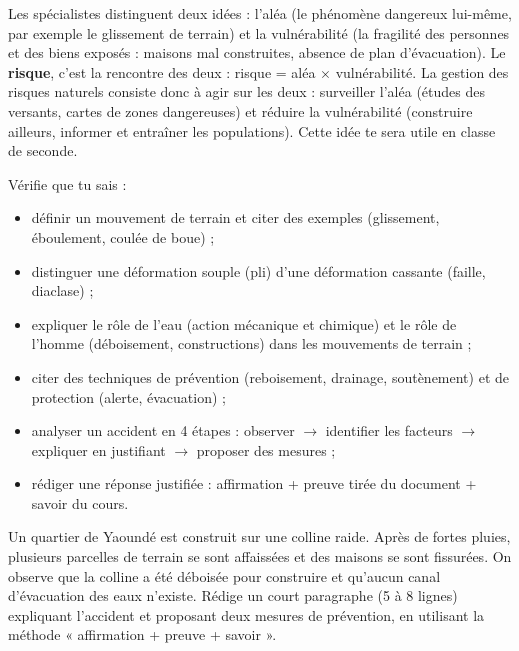\documentclass[11pt]{article}
\newcommand{\cle}[1]{{\popxbold\color{popdark}#1}}
\newcounter{popsec}
\newcounter{popsub}
\newcommand{\courssub}[1]{%
  \stepcounter{popsub}%
  \par\vspace{9pt}\noindent{\popxbold\fontsize{11.5}{13}\selectfont\color{popink}{\color{poporange}\thepopsec.\thepopsub}\hspace{6pt}#1}\par\nopagebreak\vspace{4pt}
}
\begin{document}
\begin{savaistu}
Les spécialistes distinguent deux idées : l'\cle{aléa} (le phénomène dangereux lui-même, par exemple le glissement de terrain) et la \cle{vulnérabilité} (la fragilité des personnes et des biens exposés : maisons mal construites, absence de plan d'évacuation). Le \textbf{risque}, c'est la rencontre des deux : risque = aléa $\times$ vulnérabilité. La \cle{gestion des risques naturels} consiste donc à agir sur les deux : surveiller l'aléa (études des versants, cartes de zones dangereuses) et réduire la vulnérabilité (construire ailleurs, informer et entraîner les populations). Cette idée te sera utile en classe de seconde.
\end{savaistu}

\courssub{Auto-évaluation}

Vérifie que tu sais :

\begin{itemize}
\item[$\square$] définir un mouvement de terrain et citer des exemples (glissement, éboulement, coulée de boue) ;
\item[$\square$] distinguer une déformation souple (pli) d'une déformation cassante (faille, diaclase) ;
\item[$\square$] expliquer le rôle de l'eau (action mécanique et chimique) et le rôle de l'homme (déboisement, constructions) dans les mouvements de terrain ;
\item[$\square$] citer des techniques de prévention (reboisement, drainage, soutènement) et de protection (alerte, évacuation) ;
\item[$\square$] analyser un accident en 4 étapes : observer $\rightarrow$ identifier les facteurs $\rightarrow$ expliquer en justifiant $\rightarrow$ proposer des mesures ;
\item[$\square$] rédiger une réponse justifiée : affirmation + preuve tirée du document + savoir du cours.
\end{itemize}

\begin{exercice}
Un quartier de Yaoundé est construit sur une colline raide. Après de fortes pluies, plusieurs parcelles de terrain se sont affaissées et des maisons se sont fissurées. On observe que la colline a été déboisée pour construire et qu'aucun canal d'évacuation des eaux n'existe. Rédige un court paragraphe (5 à 8 lignes) expliquant l'accident et proposant deux mesures de prévention, en utilisant la méthode « affirmation + preuve + savoir ».
\end{exercice}
\end{document}
